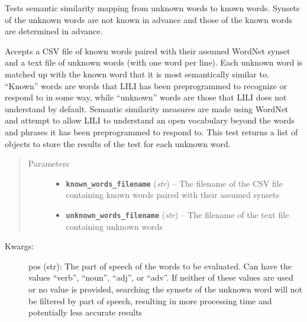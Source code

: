 \documentclass[letterpaper,10pt,english]{sphinxmanual}
\begin{document}

\begin{fulllineitems}
\label{wntest:semsim.wntest.sem_sim_test2}
Tests semantic similarity mapping from unknown words to known words. Synsets of the unknown words are not known in advance and those of the known words are determined in advance.

Accepts a CSV file of known words paired with their assumed WordNet synset and a text file of unknown words (with one word per line). Each unknown word is matched up with the known word that it is most semantically similar to. ``Known'' words are words that LILI has been preprogrammed to recognize or respond to in some way, while ``unknown'' words are those that LILI does not understand by default. Semantic similarity measures are made using WordNet and attempt to allow LILI to understand an open vocabulary beyond the words and phrases it has been preprogrammed to respond to. This test returns a list of {\hyperref[wntest:semsim.wntest.SemanticSimilarityResult]{\emph{}}} objects to store the results of the test for each unknown word.
\begin{quote}\begin{description}
\item[{Parameters}] \leavevmode\begin{itemize}
\item {} 
\textbf{\texttt{known\_words\_filename}} (\emph{str}) -- The filename of the CSV file containing known words paired with their assumed synsets

\item {} 
\textbf{\texttt{unknown\_words\_filename}} (\emph{str}) -- The filename of the text file containing unknown words

\end{itemize}

\end{description}\end{quote}
\begin{description}
\item[{Kwargs:}] \leavevmode
pos (str): The part of speech of the words to be evaluated. Can have the values ``verb'', ``noun'', ``adj'', or ``adv''. If neither of these values are used or no value is provided, searching the synsets of the unknown word will not be filtered by part of speech, resulting in more processing time and potentially less accurate results


\end{description}
\end{fulllineitems}
\end{document}
